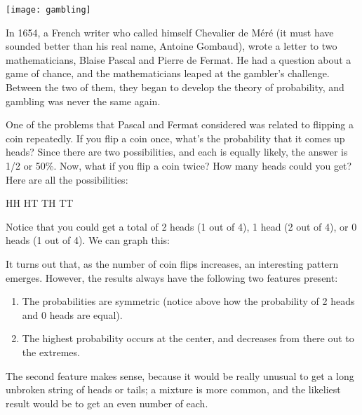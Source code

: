 \setcounter{ExampleCounter}{1}
\begin{center}
\texttt{[image: gambling]}
\end{center}
In 1654, a French writer who called himself Chevalier de M\'er\'e (it must have sounded better than his real name, Antoine Gombaud), wrote a letter to two mathematicians, Blaise Pascal and Pierre de Fermat.  He had a question about a game of chance, and the mathematicians leaped at the gambler's challenge.  Between the two of them, they began to develop the theory of probability, and gambling was never the same again.

One of the problems that Pascal and Fermat considered was related to flipping a coin repeatedly.  If you flip a coin once, what's the probability that it comes up heads?  Since there are two possibilities, and each is equally likely, the answer is 1/2 or 50\%.  Now, what if you flip a coin twice?  How many heads could you get?  Here are all the possibilities:
\begin{center}
HH \hspace{0.5in} HT \hspace{0.5in} TH \hspace{0.5in} TT
\end{center}
Notice that you could get a total of 2 heads (1 out of 4), 1 head (2 out of 4), or 0 heads (1 out of 4).  We can graph this:
\begin{center}
\end{center}

It turns out that, as the number of coin flips increases, an interesting pattern emerges.  However, the results always have the following two features present:
\begin{enumerate}
\item The probabilities are symmetric (notice above how the probability of 2 heads and 0 heads are equal).
\item The highest probability occurs at the center, and decreases from there out to the extremes.
\end{enumerate}
The second feature makes sense, because it would be really unusual to get a long unbroken string of heads or tails; a mixture is more common, and the likeliest result would be to get an even number of each.
\pagebreak

